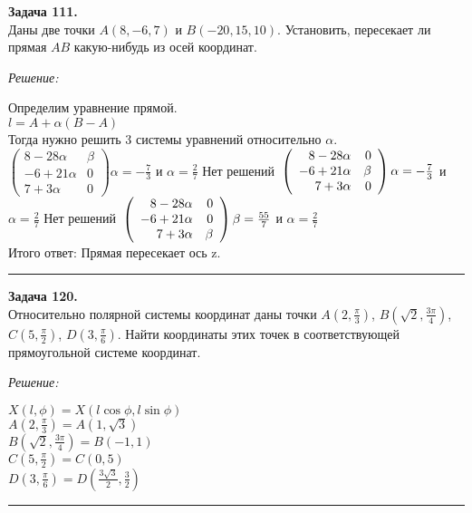 \documentclass[a4paper, 12pt]{article}
\newenvironment{problem}[2][Задача]
    { \begin{mdframed}[backgroundcolor=gray!10] \textbf{#1 #2.} \\}
    {  \end{mdframed}}
\newenvironment{solution}
    {\textit{Решение: }}
    {\noindent\rule{7in}{1.5pt}}
\begin{document}
\begin{problem}{111}
Даны две точки $A(8,-6,7)$ и $B(-20,15,10)$. Установить, пересекает ли прямая $AB$ какую-нибудь из осей координат.
\end{problem}
\begin{solution}

Определим уравнение прямой. \\
$l = A + \alpha(B - A)$ \\
Тогда нужно решить 3 системы уравнений относительно $\alpha$. \\
$
\left(
  \begin{array}{rrr}
    8 -28\alpha & \beta \\
    -6 + 21\alpha & 0 \\
    7 + 3\alpha & 0
  \end{array}
\right)
\alpha = -\frac{7}{3}$ и $\alpha = \frac{2}{7}
$
Нет решений
$
\\
\left(
  \begin{array}{rrr}
    8 - 28\alpha & 0 \\
    -6 + 21\alpha & \beta \\
    7 + 3\alpha & 0
  \end{array}
\right)
\alpha = -\frac{7}{3}$ и $\alpha = \frac{2}{7}
$
Нет решений
$
\\
\left(
  \begin{array}{rrr}
    8 -28\alpha & 0 \\
    -6 + 21\alpha & 0 \\
    7 + 3\alpha & \beta
  \end{array}
\right)
\beta = \frac{55}{7}$ и $\alpha = \frac{2}{7}
$
\\
Итого ответ: Прямая пересекает ось z.

\end{solution}

\begin{problem}{120}
Относительно полярной системы координат даны точки $A(2,\frac{\pi}{3})$, $B(\sqrt{2},\frac{3\pi}{4})$,
$C(5,\frac{\pi}{2})$, $D(3,\frac{\pi}{6})$. Найти координаты этих точек в соответствующей прямоугольной системе координат.
\end{problem}
\begin{solution}

$X(l, \phi) = X(l\cos{\phi}, l\sin{\phi})$ \\
$A(2,\frac{\pi}{3}) = A(1, \sqrt{3})$ \\
$B(\sqrt{2},\frac{3\pi}{4}) = B(-1, 1)$ \\
$C(5,\frac{\pi}{2}) = C(0, 5)$ \\
$D(3,\frac{\pi}{6}) = D(\frac{3\sqrt{3}}{2}, \frac{3}{2})$

\end{solution}
\end{document}
